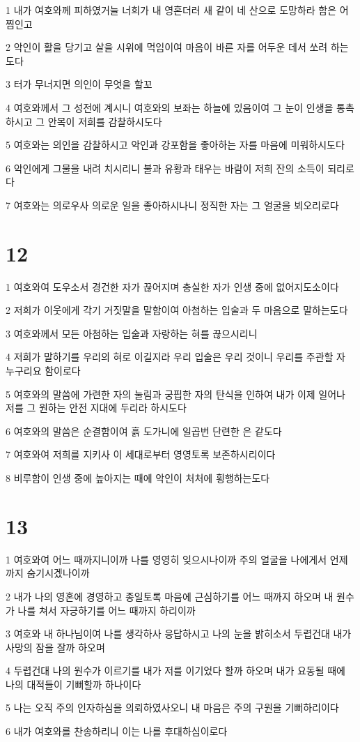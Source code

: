\par 1 내가 여호와께 피하였거늘 너희가 내 영혼더러 새 같이 네 산으로 도망하라 함은 어찜인고
\par 2 악인이 활을 당기고 살을 시위에 먹임이여 마음이 바른 자를 어두운 데서 쏘려 하는도다
\par 3 터가 무너지면 의인이 무엇을 할꼬
\par 4 여호와께서 그 성전에 계시니 여호와의 보좌는 하늘에 있음이여 그 눈이 인생을 통촉하시고 그 안목이 저희를 감찰하시도다
\par 5 여호와는 의인을 감찰하시고 악인과 강포함을 좋아하는 자를 마음에 미워하시도다
\par 6 악인에게 그물을 내려 치시리니 불과 유황과 태우는 바람이 저희 잔의 소득이 되리로다
\par 7 여호와는 의로우사 의로운 일을 좋아하시나니 정직한 자는 그 얼굴을 뵈오리로다

\chapter{12}

\par 1 여호와여 도우소서 경건한 자가 끊어지며 충실한 자가 인생 중에 없어지도소이다
\par 2 저희가 이웃에게 각기 거짓말을 말함이여 아첨하는 입술과 두 마음으로 말하는도다
\par 3 여호와께서 모든 아첨하는 입술과 자랑하는 혀를 끊으시리니
\par 4 저희가 말하기를 우리의 혀로 이길지라 우리 입술은 우리 것이니 우리를 주관할 자 누구리요 함이로다
\par 5 여호와의 말씀에 가련한 자의 눌림과 궁핍한 자의 탄식을 인하여 내가 이제 일어나 저를 그 원하는 안전 지대에 두리라 하시도다
\par 6 여호와의 말씀은 순결함이여 흙 도가니에 일곱번 단련한 은 같도다
\par 7 여호와여 저희를 지키사 이 세대로부터 영영토록 보존하시리이다
\par 8 비루함이 인생 중에 높아지는 때에 악인이 처처에 횡행하는도다

\chapter{13}

\par 1 여호와여 어느 때까지니이까 나를 영영히 잊으시나이까 주의 얼굴을 나에게서 언제까지 숨기시겠나이까
\par 2 내가 나의 영혼에 경영하고 종일토록 마음에 근심하기를 어느 때까지 하오며 내 원수가 나를 쳐서 자긍하기를 어느 때까지 하리이까
\par 3 여호와 내 하나님이여 나를 생각하사 응답하시고 나의 눈을 밝히소서 두렵건대 내가 사망의 잠을 잘까 하오며
\par 4 두렵건대 나의 원수가 이르기를 내가 저를 이기었다 할까 하오며 내가 요동될 때에 나의 대적들이 기뻐할까 하나이다
\par 5 나는 오직 주의 인자하심을 의뢰하였사오니 내 마음은 주의 구원을 기뻐하리이다
\par 6 내가 여호와를 찬송하리니 이는 나를 후대하심이로다

